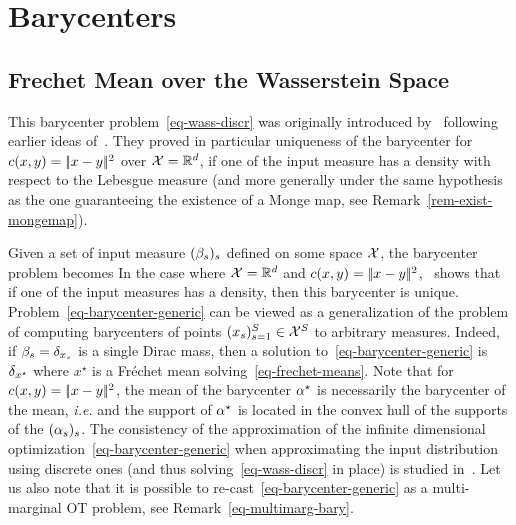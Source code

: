 


\section{Barycenters}

\subsection{Frechet Mean over the Wasserstein Space}

 
This barycenter problem~\eqref{eq-wass-discr} was originally introduced by~\cite{Carlier_wasserstein_barycenter} following earlier ideas of~\cite{carlierekelandmatching}. They proved in particular uniqueness of the barycenter for $c(x,y)=|\!| x-y |\!|^2$ over $\mathcal{X}=\mathbb{R}^d$, if one of the input measure has a density with respect to the Lebesgue measure (and more generally under the same hypothesis as the one guaranteeing the existence of a Monge map, see Remark~\ref{rem-exist-mongemap}).

Given a set of input measure $(\beta_s)_s$ defined on some space $\mathcal{X}$, the barycenter problem becomes 
	In the case where $\mathcal{X}=\mathbb{R}^d$ and $c(x,y)=|\!| x-y |\!|^2$,~\cite{Carlier_wasserstein_barycenter} shows that if one of the input measures has a density, then this barycenter is unique. 
	Problem~\eqref{eq-barycenter-generic} can be viewed as a generalization of the problem of computing barycenters of points $(x_s)_{s=1}^S \in \mathcal{X}^S$ to arbitrary measures. Indeed, if $\beta_s=\delta_{x_s}$ is a single Dirac mass, then a solution to~\eqref{eq-barycenter-generic} is $\delta_{x^\star}$ where $x^\star$ is a Fr\'echet mean solving~\eqref{eq-frechet-means}.
	Note that for $c(x,y)=|\!| x-y |\!|^2$, the mean of the barycenter $\alpha^\star$ is necessarily the barycenter of the mean, \emph{i.e.} 
	and the support of $\alpha^\star$ is located in the convex hull of the supports of the $(\alpha_s)_s$.
	The consistency of the approximation of the infinite dimensional optimization~\eqref{eq-barycenter-generic} when approximating the input distribution using discrete ones (and thus solving~\eqref{eq-wass-discr} in place) is studied in~\cite{Carlier-NumericsBarycenters}.
	Let us also note that it is possible to re-cast~\eqref{eq-barycenter-generic} as a multi-marginal OT problem, see Remark~\ref{eq-multimarg-bary}.
	

